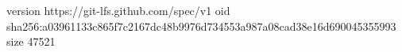 version https://git-lfs.github.com/spec/v1
oid sha256:a03961133c865f7c2167dc48b9976d734553a987a08cad38e16d690045355993
size 47521
